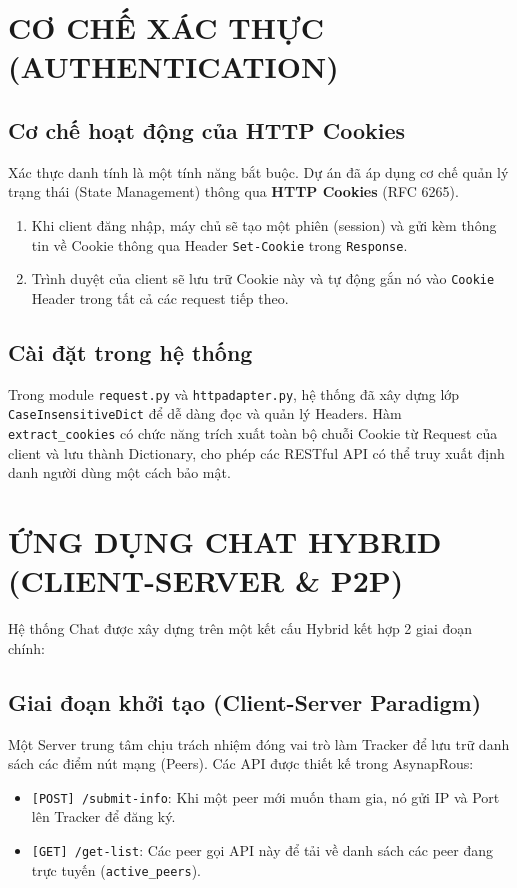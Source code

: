 \documentclass[a4paper,12pt]{article}
\begin{document}
\newpage
\section{CƠ CHẾ XÁC THỰC (AUTHENTICATION)}

\subsection{Cơ chế hoạt động của HTTP Cookies}
Xác thực danh tính là một tính năng bắt buộc. Dự án đã áp dụng cơ chế quản lý trạng thái (State Management) thông qua \textbf{HTTP Cookies} (RFC 6265).
\begin{enumerate}
    \item Khi client đăng nhập, máy chủ sẽ tạo một phiên (session) và gửi kèm thông tin về Cookie thông qua Header \texttt{Set-Cookie} trong \texttt{Response}.
    \item Trình duyệt của client sẽ lưu trữ Cookie này và tự động gắn nó vào \texttt{Cookie} Header trong tất cả các request tiếp theo.
\end{enumerate}

\subsection{Cài đặt trong hệ thống}
Trong module \texttt{request.py} và \texttt{httpadapter.py}, hệ thống đã xây dựng lớp \texttt{CaseInsensitiveDict} để dễ dàng đọc và quản lý Headers. Hàm \texttt{extract\_cookies} có chức năng trích xuất toàn bộ chuỗi Cookie từ Request của client và lưu thành Dictionary, cho phép các RESTful API có thể truy xuất định danh người dùng một cách bảo mật.

\newpage
\section{ỨNG DỤNG CHAT HYBRID (CLIENT-SERVER \& P2P)}

Hệ thống Chat được xây dựng trên một kết cấu Hybrid kết hợp 2 giai đoạn chính:

\subsection{Giai đoạn khởi tạo (Client-Server Paradigm)}
Một Server trung tâm chịu trách nhiệm đóng vai trò làm Tracker để lưu trữ danh sách các điểm nút mạng (Peers).
Các API được thiết kế trong AsynapRous:
\begin{itemize}
    \item \texttt{[POST] /submit-info}: Khi một peer mới muốn tham gia, nó gửi IP và Port lên Tracker để đăng ký.
    \item \texttt{[GET] /get-list}: Các peer gọi API này để tải về danh sách các peer đang trực tuyến (\texttt{active\_peers}).
\end{itemize}
\end{document}
